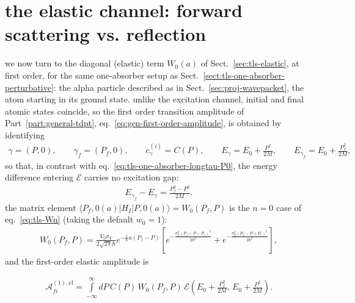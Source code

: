 \section{the elastic channel: forward scattering vs. reflection}\label{sec:tls-one-absorber-elastic}

we now turn to the diagonal (elastic) term $W_0(a)$ of Sect.~\ref{sec:tls-elastic}, at first order, for the same one-absorber setup as Sect.~\ref{sect:tls-one-absorber-perturbative}: the alpha particle described as in Sect.~\ref{sec:proj-wavepacket}, the atom starting in its ground state. unlike the excitation channel, initial and final atomic states coincide, so the first order transition amplitude of Part~\ref{part:general-tdpt}, eq.~\eqref{eq:gen-first-order-amplitude}, is obtained by identifying
\begin{align}
    \gamma = (P,0),\qquad \gamma_f = (P_f,0),\qquad c_\gamma^{(i)} = C(P),\qquad E_\gamma = E_0+\frac{P^2}{2M},\qquad E_{\gamma_f} = E_0+\frac{P_f^2}{2M},
\end{align}
so that, in contrast with eq.~\eqref{eq:tls-one-absorber-longtau-P0}, the energy difference entering $\mathcal E$ carries no excitation gap:
\begin{align}
    E_{\gamma_f}-E_\gamma = \frac{P_f^2-P^2}{2M}.
\end{align}
the matrix element $\langle P_f,0(a)|H_I|P,0(a)\rangle = W_0(P_f,P)$ is the $n=0$ case of eq.~\eqref{eq:tls-Wn} (taking the default $w_0=1$):
\begin{align}
    W_0(P_f,P) = \frac{V_0\sigma_V}{2\sqrt{2\pi}\hbar}e^{-\frac{i}{\hbar}a(P_f-P)}\left[e^{-\frac{\sigma_V^2(P_f-P-P_e)^2}{2\hbar^2}}+e^{-\frac{\sigma_V^2(P_f-P+P_e)^2}{2\hbar^2}}\right],
\end{align}
and the first-order elastic amplitude is
\begin{importantbox}
    \begin{align}
        \mathcal A_{fi}^{(1),\text{el}} = \int\limits_{-\infty}^{\infty}dP\, C(P)\, W_0(P_f,P)\, \mathcal E\!\left(E_0+\frac{P_f^2}{2M},\,E_0+\frac{P^2}{2M}\right).\label{eq:tls-one-absorber-elastic-amplitude}
    \end{align}
\end{importantbox}

